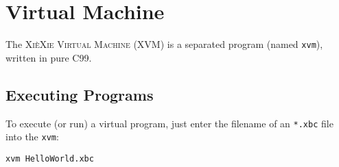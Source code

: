 \documentclass{report}
\def\xiexie{\textsc{Xi\`eXie}\xspace}
\def\xvm{\texttt{xvm}\xspace}
\begin{document}

\chapter{Virtual Machine}

The \textsc{\xiexie Virtual Machine} (XVM) is a separated program (named \xvm), written in pure C99.



\section{Executing Programs}

To execute (or run) a virtual program, just enter the filename of an \texttt{*.xbc} file into the \xvm:
\begin{lstlisting}
xvm HelloWorld.xbc
\end{lstlisting}
\end{document}

